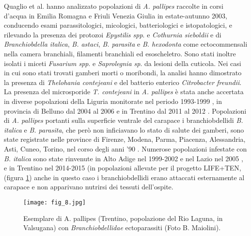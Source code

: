 \documentclass[11pt,a4paper,italian,twoside,openany]{memoir}
\newcommand{\etal}{et al. }
\begin{document}
Quaglio \etal \cite{Quaglio 2006} hanno analizzato popolazioni di \emph{A. pallipes} raccolte in corsi d'acqua in Emilia Romagna e Friuli Venezia Giulia in estate-autunno 2003, conducendo esami parassitologici, micologici, batteriologici e istopatologici, e rilevando la presenza dei protozoi \emph{Epystilis spp}. e \emph{Cothurnia sieboldii} e di \emph{Branchiobdella italica}, \emph{B. astaci}, \emph{B. parasita} e \emph{B. hexodonta} come ectocommensali nella camera branchiali, filamenti branchiali ed esoscheletro. Sono stati inoltre isolati i miceti \emph{Fusarium spp}. e \emph{Saprolegnia sp}. da lesioni della cuticola. Nei casi in cui sono stati trovati gamberi morti o moribondi, la analisi hanno dimostrato la presenza di \emph{Thelohania contejeani} e del batterio enterico \emph{Citrobacter freundii}. La presenza del microsporide \emph{T. contejeani} in \emph{A. pallipes} è stata anche accertata in diverse popolazioni della Liguria monitorate nel periodo 1993-1999 \cite{Mori 2000}, in provincia di Belluno dal 2004 al 2006 \cite{Quaglio 2011b} e in Trentino dal 2011 al 2012 \cite{Endrizzi 2013}.
Popolazioni di \emph{A. pallipes} portanti sulla superficie ventrale del carapace i branchiobdellidi \emph{B. italica} e \emph{B. parasita}, che però non inficiavano lo stato di salute dei gamberi, sono state registrate nelle province di Firenze, Modena, Parma, Piacenza, Alessandria, Asti, Cuneo, Torino, nel corso degli anni '90 \cite{Gelder 1999}. Numerose popolazioni infestate con \emph{B. italica} sono state rinvenute in Alto Adige nel 1999-2002 \cite{Oberkofler 2002} e nel Lazio nel 2005 \cite{Scalici 2010}, e in Trentino nel 2014-2015 (in popolazioni allevate per il progetto LIFE+TEN, (figura \ref{fig_8}) anche in questo caso i branchiobdellidi erano attaccati esternamente al carapace e non apparivano nutrirsi dei tessuti dell'ospite.

\begin{figure}
  \centering
  \texttt{[image: fig\_8.jpg]}
  \caption{Esemplare di A. pallipes (Trentino, popolazione del Rio Laguna, in Valsugana) con \emph{Branchiobdellidae} ectoparassiti (Foto B. Maiolini).}
  \label{fig_8}
\end{figure}
\end{document}
